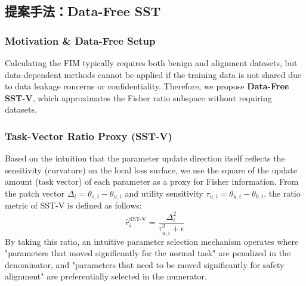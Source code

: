 \documentclass{article}
\begin{document}
\subsection{提案手法：Data-Free SST}

\subsubsection{Motivation \& Data-Free Setup}

Calculating the FIM typically requires both benign and alignment datasets, but data-dependent methods cannot be applied if the training data is not shared due to data leakage concerns or confidentiality. Therefore, we propose \textbf{Data-Free SST-V}, which approximates the Fisher ratio subspace without requiring datasets.

\subsubsection{Task-Vector Ratio Proxy (SST-V)}

Based on the intuition that the parameter update direction itself reflects the sensitivity (curvature) on the local loss surface, we use the square of the update amount (task vector) of each parameter as a proxy for Fisher information.
From the patch vector $\Delta_i = \theta_{s,i} - \theta_{u,i}$ and utility sensitivity $\tau_{u,i} = \theta_{u,i} - \theta_{0,i}$, the ratio metric of SST-V is defined as follows:
\[ \hat{r}_i^{\text{SST-V}} = \frac{\Delta_i^2}{\tau_{u,i}^2 + \epsilon} \]
By taking this ratio, an intuitive parameter selection mechanism operates where "parameters that moved significantly for the normal task" are penalized in the denominator, and "parameters that need to be moved significantly for safety alignment" are preferentially selected in the numerator.
\end{document}
